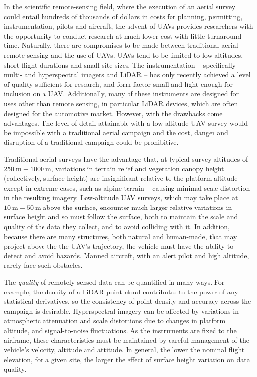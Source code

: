\documentclass[10pt]{article}
\begin{document}
In the scientific remote-sensing field, where the execution of an aerial survey could entail hundreds of thousands of dollars in costs for planning, permitting, instrumentation, pilots and aircraft, the advent of UAVs provides researchers with the opportunity to conduct research at much lower cost with little turnaround time. Naturally, there are compromises to be made between traditional aerial remote-sensing and the use of UAVs. UAVs tend to be limited to low altitudes, short flight durations and small site sizes. The instrumentation -- specifically multi- and hyperspectral imagers and LiDAR -- has only recently achieved a level of quality sufficient for research, and form factor small and light enough for inclusion on a UAV. Additionally, many of these instruments are designed for uses other than remote sensing, in particular LiDAR devices, which are often designed for the automotive market. However, with the drawbacks come advantages. The level of detail attainable with a low-altitude UAV survey would be impossible with a traditional aerial campaign and the cost, danger and disruption of a traditional campaign could be prohibitive.

Traditional aerial surveys have the advantage that, at typical survey altitudes of $\SI{250}\m-\SI{1000}\m$, variations in terrain relief and vegetation canopy height (collectively, surface height) are insignificant relative to the platform altitude -- except in extreme cases, such as alpine terrain -- causing minimal scale distortion in the resulting imagery. Low-altitude UAV surveys, which may take place at $\SI{10}\m-\SI{50}\m$ above the surface, encounter much larger relative variations in surface height and so must follow the surface, both to maintain the scale and quality of the data they collect, and to avoid colliding with it. In addition, because there are many structures, both natural and human-made, that may project above the the UAV's trajectory, the vehicle must have the ability to detect and avoid hazards. Manned aircraft, with an alert pilot and high altitude, rarely face such obstacles. 

The \emph{quality} of remotely-sensed data can be quantified in many ways. For example, the density of a LiDAR point cloud contributes to the power of any statistical derivatives, so the consistency of point density and accuracy across the campaign is desirable. Hyperspectral imagery can be affected by variations in atmospheric attenuation and scale distortions due to changes in platform altitude, and signal-to-noise fluctuations. As the instruments are fixed to the airframe, these characteristics must be maintained by careful management of the vehicle's velocity, altitude and attitude. In general, the lower the nominal flight elevation, for a given site, the larger the effect of surface height variation on data quality.
\end{document}
